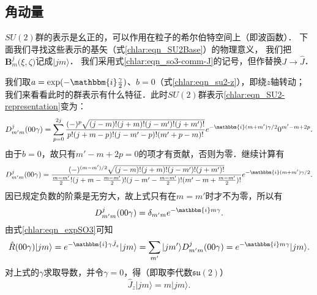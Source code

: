 \subsection{角动量}\label{chlar:sec_J}
$SU(2)$群的表示是幺正的，可以作用在粒子的希尔伯特空间上（即波函数）．
下面我们寻找这些表示的基矢（式\eqref{chlar:eqn_SU2Base}）的物理意义，
我们把$\boldsymbol{B}^j_m\bigl(\xi,\zeta\bigr)$记成$|jm\rangle$．
我们采用式\eqref{chlar:eqn_so3-comm-J}的记号，但作替换$J\to \hat{J}$．




我们取$a=\exp(-\mathbbm{i}\frac{\gamma}{2})$、$ b=0$（式\eqref{chlar:eqn_su2-z}），即绕$z$轴转动；
我们来看看此时的群表示有什么特征．此时$SU(2)$群表示\eqref{chlar:eqn_SU2-representation}变为：
\setlength{\mathindent}{0em}
\begin{align*}
    D^{j}_{m'm}(00\gamma) =  \sum_{p=0}^{2j}  
    \frac{(-)^{p}  \sqrt{(j-m)! (j+m)! (j-m')! (j+m')!}   } 
    {p!(j+m-p)! (j-m'-p)! (m'+p-m)!} 
    {e}^{-\mathbbm{i}(m+m') \gamma / 2} 0^{m'-m+2p}.
\end{align*}\setlength{\mathindent}{2em}
由于$b=0$，故只有$m'-m+2p=0$的项才有贡献，否则为零．继续计算有
\begin{align*}
    D^{j}_{m'm}(00\gamma) = 
    \frac{(-)^{(m-m')/2}  \sqrt{(j-m)! (j+m)! (j-m')! (j+m')!}   } 
    {\frac{m-m'}{2}!(j+m-\frac{m-m'}{2})! (j-m'-\frac{m-m'}{2})! (m'-m+\frac{m-m'}{2})!}
    {e}^{-\mathbbm{i}(m+m') \gamma / 2} .
\end{align*}
因已规定负数的阶乘是无穷大，故上式只有在$m=m'$时才不为零，所以有
\begin{equation}\label{chlar:eqn_z-rep}
    D^{j}_{m'm}(00\gamma) =\delta_{m'm} {e}^{-\mathbbm{i}m \gamma} .
\end{equation}
由式\eqref{chlar:eqn_expSO3}可知
\begin{equation}
    \hat{R}(00\gamma)|jm\rangle = e^{-\mathbbm{i}\gamma \hat{J}_z} |jm\rangle
    = \sum_{m'} |jm'\rangle  D^{j}_{m'm}(00\gamma) 
    = {e}^{-\mathbbm{i}m \gamma} |jm\rangle.
\end{equation}
对上式的$\gamma$求取导数，并令$\gamma=0$，得（即取李代数$\mathfrak{su}(2)$）
\begin{equation}\label{chlar:eqn_Jzpsi}
    \hat{J}_z|jm\rangle = m |jm\rangle.
\end{equation}


